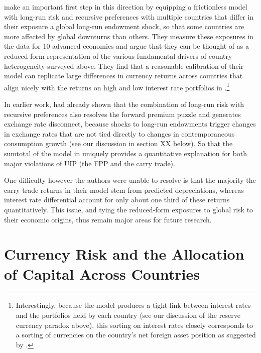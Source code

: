 \documentclass{ar-1col}
\begin{document}
\citet{ColacitoCroceHoHoward2018} make an important first step in this direction by equipping a frictionless model with long-run risk and recursive preferences with multiple countries that differ in their exposure a global long-run endowment shock, so that some countries are more affected by global downturns than others. They measure these exposures in the data for 10 advanced economies and argue that they can be thought of as a reduced-form representation of the various fundamental drivers of country heterogeneity surveyed above. They find that a reasonable calibration of their model can replicate large differences in currency returns across countries that align nicely with the returns on high and low interest rate portfolios in \cite{LustigRoussanovVerdelhan2011}.\footnote{ Interestingly, because the model produces a tight link between interest rates and the portfolios held by each country (see our discussion of the reserve currency paradox above), this sorting on interest rates closely corresponds to a sorting of currencies on the country's net foreign asset position as suggested by \citet{DellaCorteetal2016}.} 

In earlier work, \citet{ColacitoCroce2013} had already shown that the combination of long-run risk with recursive preferences also resolves the forward premium puzzle and generates exchange rate disconnect, because shocks to long-run endowments trigger changes in exchange rates that are not tied directly to changes in contemporaneous consumption growth (see our discussion in section XX below). So that the sumtotal of the model in \citet{ColacitoCroceHoHoward2018} uniquely provides a quantitative explanation for both major violations of UIP (the FPP and the carry trade).

One difficulty however the authors were unable to resolve is that the majority the carry trade returns in their model stem from predicted depreciations, whereas interest rate differential account for only about one third of these returns quantitatively. This issue, and tying the reduced-form exposures to global risk to their economic origins, thus remain major areas for future research.

\section{Currency Risk and the Allocation of Capital Across Countries\label{sec_capital}}
\end{document}
